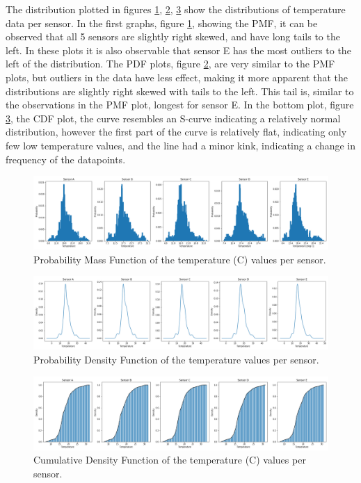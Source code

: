 \documentclass[a4paper,12pt]{article} %
\begin{document}
\begin{enumerate}
The distribution plotted in figures \ref{fig:PMF}, \ref{fig:PDF}, \ref{fig:CDF} show the distributions of temperature data per sensor. In the first graphs, figure \ref{fig:PMF}, showing the PMF, it can be observed that all 5 sensors are slightly right skewed, and have long tails to the left. In these plots it is also observable that sensor E has the most outliers to the left of the distribution. The PDF plots, figure \ref{fig:PDF}, are very similar to the PMF plots, but outliers in the data have less effect, making it more apparent that the distributions are slightly right skewed with tails to the left. This tail is, similar to the observations in the PMF plot, longest for sensor E. In the bottom plot, figure \ref{fig:CDF}, the CDF plot, the curve resembles an S-curve indicating a relatively normal distribution, however the first part of the curve is relatively flat, indicating only few low temperature values, and the line had a minor kink, indicating a change in frequency of the datapoints. 

 \begin{figure}[H] 
	\centering
	\includegraphics[width=1\textwidth]{PMF of temperature per sensor.png} 
	\caption{Probability Mass Function of the temperature (\degree C) values per sensor.} %
	\label{fig:PMF}
\end{figure} 

 \begin{figure}[H] 
	\centering
	\includegraphics[width=1\textwidth]{PDF of temperature per sensor.png} 
	\caption{Probability Density Function of the temperature values per sensor.} %
	\label{fig:PDF}
\end{figure} 

 \begin{figure}[H] 
	\centering
	\includegraphics[width=1\textwidth]{CDF of temperature per sensor.png} 
	\caption{Cumulative Density Function of the temperature (\degree C) values per sensor.} %
	\label{fig:CDF}
\end{figure} 




\end{enumerate}
\end{document}
